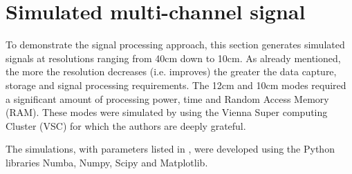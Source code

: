 \section{Simulated multi-channel signal}
\label{sc:mysimulation}
To demonstrate the signal processing approach, this section generates simulated signals at resolutions ranging from 40cm down to 10cm. As already mentioned, the more the resolution decreases (i.e. improves) the greater the data capture, storage and signal processing requirements. The 12cm and 10cm modes required a significant amount of processing power, time and Random Access Memory (RAM). These modes were simulated by using the Vienna Super computing Cluster (VSC) for which the authors are deeply grateful. 
\par
The simulations, with parameters listed in , were developed using the Python libraries Numba, Numpy, Scipy and Matplotlib. 
